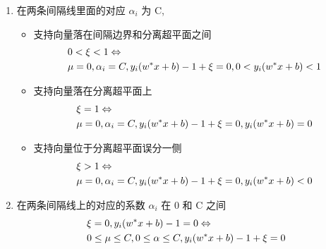 \documentclass[oneside, 12pt]{ctexbook}
\begin{document}
\begin{enumerate}
\begin{enumerate}
							\item 在两条间隔线里面的对应 $\alpha_i$ 为 C,
								\begin{itemize}
									\item 支持向量落在间隔边界和分离超平面之间
										\begin{align}
											&0 < \xi < 1 \Leftrightarrow \notag \\
											 &\mu =0, \alpha_i = C, y_i(w^* x + b) -1 + \xi = 0, 0 < y_i(w^* x + b) < 1 
										\end{align}
										
									\item 支持向量落在分离超平面上
										\begin{align}
											&\xi = 1 \Leftrightarrow \notag \\
											&\mu =0, \alpha_i = C, y_i(w^* x + b) -1 + \xi = 0,  y_i(w^* x + b) = 0  
										\end{align}
										
									\item 支持向量位于分离超平面误分一侧
										\begin{align}
											&\xi > 1 \Leftrightarrow \notag \\
											&\mu =0, \alpha_i = C, y_i(w^* x + b) -1 + \xi = 0, y_i(w^* x + b) < 0  
										\end{align}
								\end{itemize}
								
							\item 在两条间隔线上的对应的系数 $\alpha_i$ 在 0 和 C 之间
								\begin{align}
									&\xi = 0, y_i(w^* x + b) -1 = 0 \Leftrightarrow \notag \\
									&0 \leq \mu \leq C, 0 \leq \alpha \leq C, y_i(w^* x + b) -1 + \xi = 0
								\end{align}
						\end{enumerate}							
				\end{enumerate}
			
\end{document}
